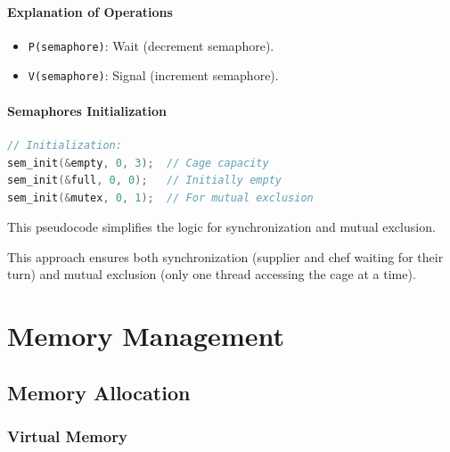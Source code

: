 \documentclass[a4paper]{book}
\begin{document}
\subsubsection{Explanation of Operations}
\begin{itemize}
\item 
\verb|P(semaphore)|: Wait (decrement semaphore).

\item 
\verb|V(semaphore)|: Signal (increment semaphore).

\end{itemize}

\subsubsection{Semaphores Initialization}

\begin{lstlisting}[language=c]
// Initialization:
sem_init(&empty, 0, 3);  // Cage capacity
sem_init(&full, 0, 0);   // Initially empty
sem_init(&mutex, 0, 1);  // For mutual exclusion
\end{lstlisting}

This pseudocode simplifies the logic for synchronization and mutual exclusion.

This approach ensures both synchronization (supplier and chef waiting for their turn) and mutual exclusion (only one thread accessing the cage at a time).

\chapter{Memory Management}

\section{Memory Allocation}

\subsection{Virtual Memory}
\end{document}
